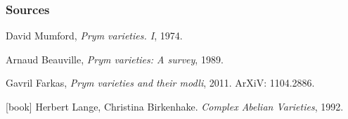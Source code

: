 \begin{frame}
\frametitle{Sources}

\begin{thebibliography}{9}

  David Mumford,
  \newblock \textit{Prym varieties. {I}}, 1974.

  Arnaud Beauville,
  \newblock \textit{Prym varieties: A survey}, 1989.

  Gavril Farkas,
  \newblock \textit{Prym varieties and their modli}, 2011. ArXiV: 1104.2886.

  [book]
  Herbert Lange, Christina Birkenhake.
  \newblock \textit{Complex Abelian Varieties}, 1992.

\end{thebibliography}
\end{frame}